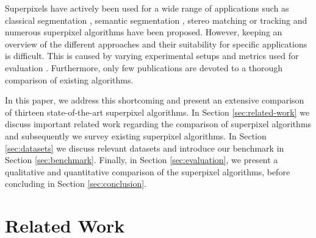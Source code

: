 \documentclass[runningheads]{llncs}
\begin{document}
    Superpixels have actively been used for a wide range of applications such as classical segmentation \cite{RenMalik:2003,RohkohlEngel:2007}, semantic segmentation \cite{GuptaArbelaezMalik:2013}, stereo matching \cite{YuhangZhangHartleyMashfordBurn:2011} or tracking \cite{ShuWangHuchuanLuFanYangMingHsuanYang:2011} and numerous superpixel algorithms have been proposed.
    However, keeping an overview of the different approaches and their suitability for specific applications is difficult. This is caused by varying experimental setups and metrics used for evaluation \cite{NeubertProtzel:2012}. Furthermore, only few publications are devoted to a thorough comparison of existing algorithms.
    
    In this paper, we address this shortcoming and present an extensive comparison of thirteen state-of-the-art superpixel algorithms. In Section \ref{sec:related-work} we discuss important related work regarding the comparison of superpixel algorithms and subsequently we survey existing superpixel algorithms. In Section \ref{sec:datasets} we discuss relevant datasets and introduce our benchmark in Section \ref{sec:benchmark}. Finally, in Section \ref{sec:evaluation}, we present a qualitative and quantitative comparison of the superpixel algorithms, before concluding in Section \ref{sec:conclusion}.
    
    \vspace{-1mm}
    \section{Related Work}
    \vspace{-0.5mm}
    \label{sec:related-work}
    
\end{document}
